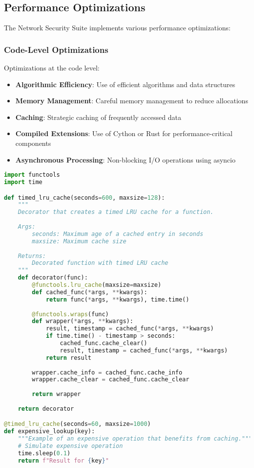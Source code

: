 \subsection{Performance Optimizations}
The Network Security Suite implements various performance optimizations:

\subsubsection{Code-Level Optimizations}
Optimizations at the code level:

\begin{itemize}
    \item \textbf{Algorithmic Efficiency}: Use of efficient algorithms and data structures
    \item \textbf{Memory Management}: Careful memory management to reduce allocations
    \item \textbf{Caching}: Strategic caching of frequently accessed data
    \item \textbf{Compiled Extensions}: Use of Cython or Rust for performance-critical components
    \item \textbf{Asynchronous Processing}: Non-blocking I/O operations using asyncio
\end{itemize}

\begin{lstlisting}[language=python, caption=Caching Example]
import functools
import time

def timed_lru_cache(seconds=600, maxsize=128):
    """
    Decorator that creates a timed LRU cache for a function.
    
    Args:
        seconds: Maximum age of a cached entry in seconds
        maxsize: Maximum cache size
        
    Returns:
        Decorated function with timed LRU cache
    """
    def decorator(func):
        @functools.lru_cache(maxsize=maxsize)
        def cached_func(*args, **kwargs):
            return func(*args, **kwargs), time.time()
            
        @functools.wraps(func)
        def wrapper(*args, **kwargs):
            result, timestamp = cached_func(*args, **kwargs)
            if time.time() - timestamp > seconds:
                cached_func.cache_clear()
                result, timestamp = cached_func(*args, **kwargs)
            return result
            
        wrapper.cache_info = cached_func.cache_info
        wrapper.cache_clear = cached_func.cache_clear
        
        return wrapper
        
    return decorator

@timed_lru_cache(seconds=60, maxsize=1000)
def expensive_lookup(key):
    """Example of an expensive operation that benefits from caching."""
    # Simulate expensive operation
    time.sleep(0.1)
    return f"Result for {key}"
\end{lstlisting}

